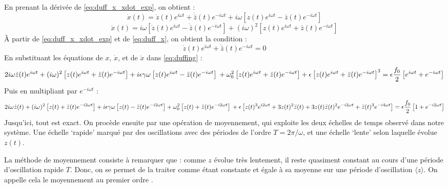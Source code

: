 En prenant la dérivée de \eqref{eq:duff_x_xdot_exp}, on obtient :
\begin{equation}
    \dot{x}(t) = \dot{z}(t)e^{i\omega t} + \dot{\bar{z}}(t) e^{-i\omega t} + i\omega \left[ z(t)e^{i\omega t} - \bar{z}(t) e^{-i\omega t} \right]
    \label{eq:duff_x}
\end{equation}
\begin{equation}
    \ddot{x}(t) = i\omega \left[ \dot{z}(t)e^{i\omega t} - \dot{\bar{z}}(t) e^{-i\omega t} \right] + (i\omega)^2 \left[ z(t)e^{i\omega t} + \bar{z}(t) e^{-i\omega t} \right]
\end{equation}
À partir de \eqref{eq:duff_x_xdot_exp} et de \eqref{eq:duff_x}, on obtient la condition :
\begin{equation}
    \dot{z}(t)e^{i\omega t} + \dot{\bar{z}}(t) e^{-i\omega t} = 0
\end{equation}
%
En substituant les équations de $x$, $\dot{x}$, et de $\ddot{x}$ dans \eqref{eq:duffing} :
%
\begin{dmath}
    2i\omega \dot{z}(t)e^{i\omega t} + (i\omega)^2 \left[ z(t)e^{i\omega t} + \bar{z}(t) e^{-i\omega t} \right]
    + i\epsilon\gamma\omega \left[ z(t)e^{i\omega t} - \bar{z}(t) e^{-i\omega t} \right] \\
    + \omega_0^2 \left[ z(t)e^{i\omega t} + \bar{z}(t) e^{-i\omega t} \right]
    + \epsilon \left[ z(t)e^{i\omega t} + \bar{z}(t) e^{-i\omega t} \right]^3 = \epsilon \frac{f_0}{2}\left[ e^{i\omega t} + e^{-i\omega t} \right]
\end{dmath}
Puis en multipliant par $e^{-i\omega t}$ :
\begin{dmath}
    2i\omega \dot{z}(t) + (i\omega)^2 \left[ z(t) + \bar{z}(t) e^{-i 2 \omega t} \right]
    + i\epsilon\gamma\omega \left[ z(t) - \bar{z}(t) e^{-i 2 \omega t} \right]
    + \omega_0^2 \left[ z(t) + \bar{z}(t) e^{-i 2 \omega t} \right] \\
    + \epsilon \left[ z(t)^3 e^{i 2 \omega t} + 3 z(t)^2 \bar{z}(t) + 3z(t)\bar{z}(t)^2 e^{-i2\omega t} + \bar{z}(t)^3 e^{-i4 \omega t} \right]
    = \epsilon \frac{f_0}{2}\left[ 1 + e^{-i 2 \omega t} \right]
    \label{eq:duff_pre_av}
\end{dmath}
%
%
%
Jusqu'ici, tout est exact. On procède ensuite par une opération de moyennement, qui exploite les deux échelles de temps observé dans notre système. 
Une échelle `rapide' marqué par des oscillations avec des périodes de l'ordre $T = 2\pi / \omega$, 
et une échelle `lente' selon laquelle évolue $z(t)$. 

La méthode de moyennement consiste à remarquer que : comme $z$ évolue très lentement, 
il reste quasiment constant au cours d'une période d'oscillation rapide $T$. 
Donc, on se permet de la traiter comme étant constante et égale à sa moyenne sur une période d'oscillation $\langle z \rangle$.
On appelle cela le moyennement au premier ordre \cite{rand_lecture_2012}.

